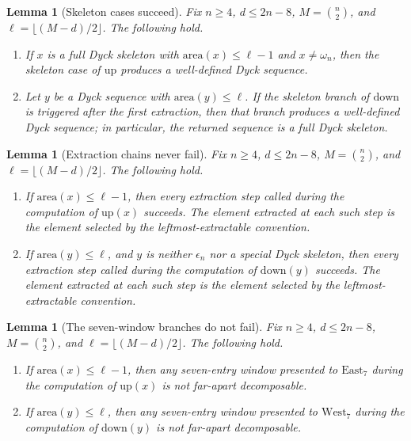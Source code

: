 \documentclass[11pt]{article}
\theoremstyle{plain}
\newtheorem{lemma}[theorem]{Lemma}
\theoremstyle{definition}
\theoremstyle{remark}
\newcommand{\area}{\mathrm{area}}
\begin{document}
\begin{lemma}[Skeleton cases succeed]
\label{lem:skeleton-wd}
Fix \(n\ge4\), \(d\le2n-8\), \(M=\binom n2\), and
\(\ell=\lfloor(M-d)/2\rfloor\).  The following hold.
\begin{enumerate}[label=\textup{(\roman*)}]
  \item If \(x\) is a full Dyck skeleton with \(\area(x)\le \ell-1\) and
  \(x\ne\omega_n\), then the skeleton case of \(\mathrm{up}\) produces a
  well-defined Dyck sequence.

  \item Let \(y\) be a Dyck sequence with \(\area(y)\le \ell\).  If the
  skeleton branch of \(\mathrm{down}\) is triggered after the first extraction,
  then that branch produces a well-defined Dyck sequence; in particular, the
  returned sequence is a full Dyck skeleton.
\end{enumerate}
\end{lemma}

\begin{lemma}[Extraction chains never fail]
\label{lem:extractions-wd}
Fix \(n\ge4\), \(d\le2n-8\), \(M=\binom n2\), and
\(\ell=\lfloor(M-d)/2\rfloor\).  The following hold.
\begin{enumerate}[label=\textup{(\roman*)}]
  \item If \(\area(x)\le \ell-1\), then every extraction step called during the
  computation of \(\mathrm{up}(x)\) succeeds.  The element extracted at each
  such step is the element selected by the leftmost-extractable convention.

  \item If \(\area(y)\le \ell\), and \(y\) is neither \(\epsilon_n\) nor a
  special Dyck skeleton, then every extraction step called during the
  computation of \(\mathrm{down}(y)\) succeeds.  The element extracted at each
  such step is the element selected by the leftmost-extractable convention.
\end{enumerate}
\end{lemma}

\begin{lemma}[The seven-window branches do not fail]
\label{lem:east7-wd}
Fix \(n\ge4\), \(d\le2n-8\), \(M=\binom n2\), and
\(\ell=\lfloor(M-d)/2\rfloor\).  The following hold.
\begin{enumerate}[label=\textup{(\roman*)}]
  \item If \(\area(x)\le \ell-1\), then any seven-entry window presented to
  \(\mathrm{East}_7\) during the computation of \(\mathrm{up}(x)\) is not
  far-apart decomposable.

  \item If \(\area(y)\le \ell\), then any seven-entry window presented to
  \(\mathrm{West}_7\) during the computation of \(\mathrm{down}(y)\) is not
  far-apart decomposable.
\end{enumerate}
\end{lemma}
\end{document}
